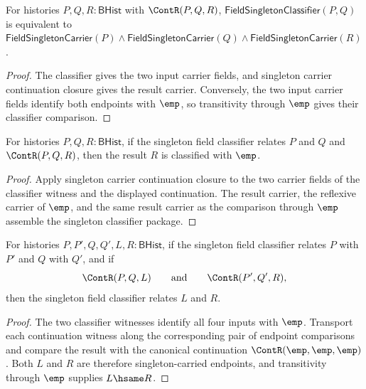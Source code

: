 \begin{theorem}
\label{thm:field-singleton-classifier-continuation-endpoint-split}
For histories $P,Q,R:\mathsf{BHist}$ with $\ContR(P,Q,R)$,
$\mathsf{FieldSingletonClassifier}(P,Q)$ is equivalent to
$\mathsf{FieldSingletonCarrier}(P)\land\mathsf{FieldSingletonCarrier}(Q)\land\mathsf{FieldSingletonCarrier}(R)$.
\end{theorem}
\begin{proof}
The classifier gives the two input carrier fields, and singleton carrier
continuation closure gives the result carrier. Conversely, the two input
carrier fields identify both endpoints with $\emp$, so transitivity through $\emp$ gives their classifier comparison.
\end{proof}
\begin{theorem}
\label{thm:field-singleton-classifier-continuation-result-classifier}
For histories $P,Q,R:\mathsf{BHist}$, if the singleton field classifier
relates $P$ and $Q$ and $\ContR(P,Q,R)$, then the result $R$ is classified
with $\emp$.
\end{theorem}
\begin{proof}
Apply singleton carrier continuation closure to the two carrier fields of the
classifier witness and the displayed continuation. The result carrier, the
reflexive carrier of $\emp$, and the same result carrier as the comparison
through $\emp$ assemble the singleton classifier package.
\end{proof}

\begin{theorem}
\label{thm:field-singleton-classifier-continuation-closed}
For histories $P,P',Q,Q',L,R:\mathsf{BHist}$, if the singleton field
classifier relates $P$ with $P'$ and $Q$ with $Q'$, and if
$$
\ContR(P,Q,L)
\qquad\text{and}\qquad
\ContR(P',Q',R),
$$
then the singleton field classifier relates $L$ and $R$.
\end{theorem}
\begin{proof}
The two classifier witnesses identify all four inputs with $\emp$. Transport
each continuation witness along the corresponding pair of endpoint
comparisons and compare the result with the canonical continuation
$\ContR(\emp,\emp,\emp)$. Both $L$ and $R$ are therefore singleton-carried
endpoints, and transitivity through $\emp$ supplies $L\hsame R$.
\end{proof}

